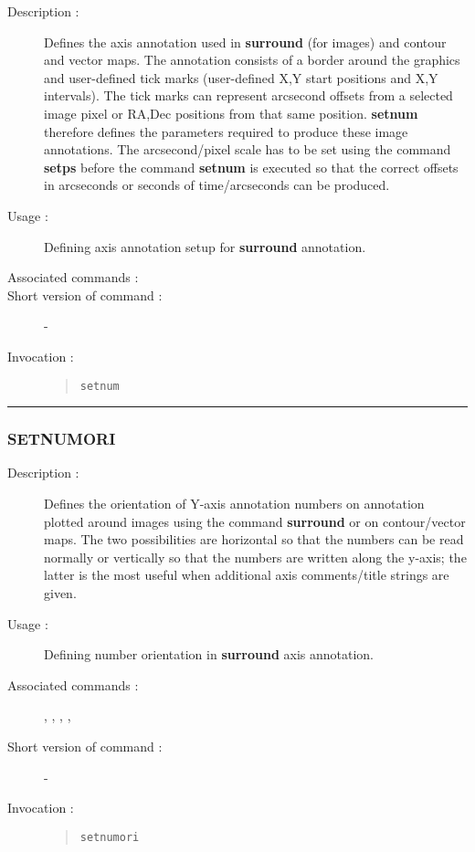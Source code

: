 \begin{description}

\item[Description :] Defines the axis annotation used in {\bf surround} (for
images) and contour and vector maps.  The annotation consists of a
border around the graphics and user-defined tick marks (user-defined
X,Y start positions and X,Y intervals).  The tick marks can represent
arcsecond offsets from a selected image pixel or RA,Dec positions from
that same position.  {\bf setnum} therefore defines the parameters
required to produce these image annotations.  The arcsecond/pixel scale
has to be set using the command {\bf setps} before the command {\bf
setnum} is executed so that the correct offsets in arcseconds or
seconds of time/arcseconds can be produced.

\item[Usage :] Defining axis annotation setup for {\bf surround} annotation.

\item[Associated commands :] {\tt {}}

\item[Short version of command :] -
\item[Invocation :]

\begin{quote}{\tt  setnum }\end{quote}

\end{description}

\hrule 
\subsubsection*{\label{SETNUMORI}SETNUMORI}

\begin{description}

\item[Description :] Defines the orientation of Y-axis annotation numbers on
annotation plotted around images using the command {\bf surround} or on
contour/vector maps.  The two possibilities are horizontal so that the
numbers can be read normally or vertically so that the numbers are
written along the y-axis; the latter is the most useful when additional
axis comments/title strings are given.

\item[Usage :] Defining number orientation in {\bf surround} axis annotation.

\item[Associated commands :] {\tt {}}, 
{\tt {}}, {\tt {}}, 
{\tt {}}, {\tt {}}

\item[Short version of command :] -
\item[Invocation :]

\begin{quote}{\tt  setnumori }\end{quote}

\end{description}

